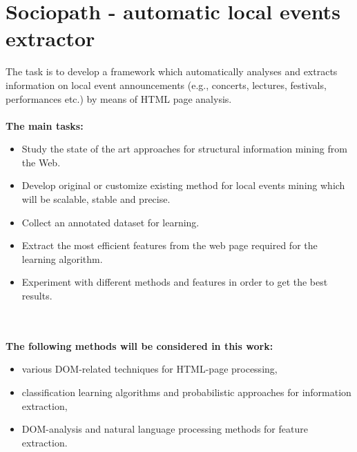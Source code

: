  \cleardoublepage \thispagestyle{empty}

\chapter*{Sociopath - automatic local events extractor}

The task is to develop a framework which automatically analyses and extracts information on local event announcements (e.g., concerts, lectures, festivals, performances etc.) by means of HTML page analysis.
\\
\\
\textbf {The main tasks:}

\begin{itemize}
\item Study the state of the art approaches for structural information mining from the Web.
\item Develop original or customize existing method for local events mining which will be scalable, stable and precise.
\item Collect an annotated dataset for learning.
\item Extract the most efficient features from the web page required for the learning algorithm.
\item Experiment with different methods and features in order to get the best results. 
\end{itemize}
\\
\\
\textbf {The following methods will be considered in this work:}

\begin{itemize}
\item various DOM-related techniques for HTML-page processing,
\item classification learning algorithms and probabilistic approaches for information extraction,
\item DOM-analysis and natural language processing methods for feature extraction.
\end{itemize}
